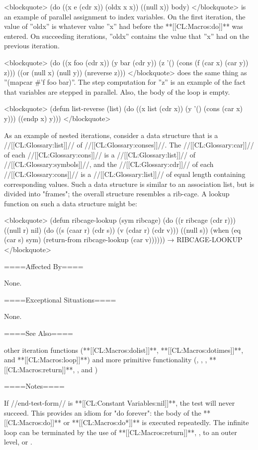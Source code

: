 <blockquote> (do ((x e (cdr x)) (oldx x x)) ((null x)) body) </blockquote> is an example of parallel assignment to index variables. On the first iteration, the value of ''oldx'' is whatever value ''x'' had before the **[[CL:Macros:do]]** was entered. On succeeding iterations, ''oldx'' contains the value that ''x'' had on the previous iteration.

<blockquote> (do ((x foo (cdr x)) (y bar (cdr y)) (z '() (cons (f (car x) (car y)) z))) ((or (null x) (null y)) (nreverse z))) </blockquote> does the same thing as ''(mapcar #'f foo bar)''. The step computation for ''z'' is an example of the fact that variables are stepped in parallel. Also, the body of the loop is empty.

<blockquote> (defun list-reverse (list) (do ((x list (cdr x)) (y '() (cons (car x) y))) ((endp x) y))) </blockquote>

As an example of nested iterations, consider a data structure that is a //[[CL:Glossary:list]]// of //[[CL:Glossary:conses]]//. The //[[CL:Glossary:car]]// of each //[[CL:Glossary:cons]]// is a //[[CL:Glossary:list]]// of //[[CL:Glossary:symbols]]//, and the //[[CL:Glossary:cdr]]// of each //[[CL:Glossary:cons]]// is a //[[CL:Glossary:list]]// of equal length containing corresponding values. Such a data structure is similar to an association list, but is divided into "frames"; the overall structure resembles a rib-cage. A lookup function on such a data structure might be:

<blockquote> (defun ribcage-lookup (sym ribcage) (do ((r ribcage (cdr r))) ((null r) nil) (do ((s (caar r) (cdr s)) (v (cdar r) (cdr v))) ((null s)) (when (eq (car s) sym) (return-from ribcage-lookup (car v)))))) → RIBCAGE-LOOKUP </blockquote>

====Affected By====

None.

====Exceptional Situations====

None.

====See Also====

other iteration functions (**[[CL:Macros:dolist]]**, **[[CL:Macros:dotimes]]**, and **[[CL:Macros:loop]]**) and more primitive functionality (, , , **[[CL:Macros:return]]**, , and )

====Notes====

If //end-test-form// is **[[CL:Constant Variables:nil]]**, the test will never succeed. This provides an idiom for "do forever": the body of the **[[CL:Macros:do]]** or **[[CL:Macros:do*]]** is executed repeatedly. The infinite loop can be terminated by the use of **[[CL:Macros:return]]**, ,  to an outer level, or .

